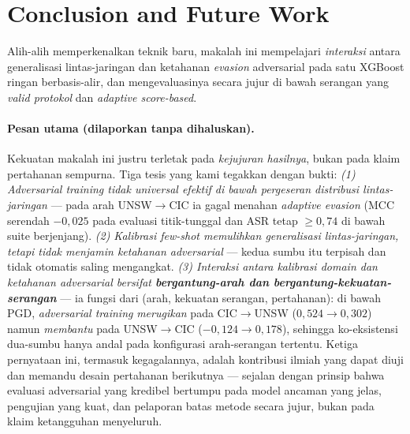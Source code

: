 \documentclass[11pt,a4paper]{article}
\begin{document}
\section{Conclusion and Future Work}
\label{sec:conclusion}
Alih-alih memperkenalkan teknik baru, makalah ini mempelajari \emph{interaksi}
antara generalisasi lintas-jaringan dan ketahanan \emph{evasion} adversarial pada
satu XGBoost ringan berbasis-alir, dan mengevaluasinya secara jujur di bawah
serangan yang \emph{valid protokol} dan \emph{adaptive score-based}.

\paragraph{Pesan utama (dilaporkan tanpa dihaluskan).} Kekuatan makalah ini justru
terletak pada \emph{kejujuran hasilnya}, bukan pada klaim pertahanan sempurna. Tiga
tesis yang kami tegakkan dengan bukti:
\emph{(1) Adversarial training tidak universal efektif di bawah pergeseran
distribusi lintas-jaringan} --- pada arah UNSW$\rightarrow$CIC ia gagal menahan
\emph{adaptive evasion} (MCC serendah $-0{,}025$ pada evaluasi titik-tunggal dan
ASR tetap $\ge0{,}74$ di bawah suite berjenjang).
\emph{(2) Kalibrasi few-shot memulihkan generalisasi lintas-jaringan, tetapi tidak
menjamin ketahanan adversarial} --- kedua sumbu itu terpisah dan tidak otomatis
saling mengangkat.
\emph{(3) Interaksi antara kalibrasi domain dan ketahanan adversarial bersifat
\textbf{bergantung-arah dan bergantung-kekuatan-serangan}} --- ia fungsi dari (arah,
kekuatan serangan, pertahanan): di bawah PGD, \emph{adversarial training}
\emph{merugikan} pada CIC$\rightarrow$UNSW ($0{,}524\rightarrow0{,}302$) namun
\emph{membantu} pada UNSW$\rightarrow$CIC ($-0{,}124\rightarrow0{,}178$), sehingga
ko-eksistensi dua-sumbu hanya andal pada konfigurasi arah-serangan tertentu. Ketiga pernyataan ini, termasuk kegagalannya, adalah
kontribusi ilmiah yang dapat diuji dan memandu desain pertahanan berikutnya ---
sejalan dengan prinsip bahwa evaluasi adversarial yang kredibel bertumpu pada model
ancaman yang jelas, pengujian yang kuat, dan pelaporan batas metode secara jujur,
bukan pada klaim ketangguhan menyeluruh.
\end{document}
